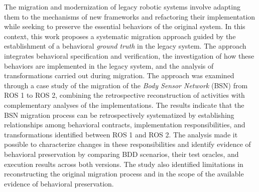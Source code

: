The migration and modernization of legacy robotic systems involve adapting them to the mechanisms of new frameworks and refactoring their implementation while seeking to preserve the essential behaviors of the original system. In this context, this work proposes a systematic migration approach guided by the establishment of a behavioral \textit{ground truth} in the legacy system. The approach integrates behavioral specification and verification, the investigation of how these behaviors are implemented in the legacy system, and the analysis of transformations carried out during migration. The approach was examined through a case study of the migration of the \textit{Body Sensor Network} (BSN) from ROS 1 to ROS 2, combining the retrospective reconstruction of activities with complementary analyses of the implementations. The results indicate that the BSN migration process can be retrospectively systematized by establishing relationships among behavioral contracts, implementation responsibilities, and transformations identified between ROS 1 and ROS 2. The analysis made it possible to characterize changes in these responsibilities and identify evidence of behavioral preservation by comparing BDD scenarios, their test oracles, and execution results across both versions. The study also identified limitations in reconstructing the original migration process and in the scope of the available evidence of behavioral preservation.